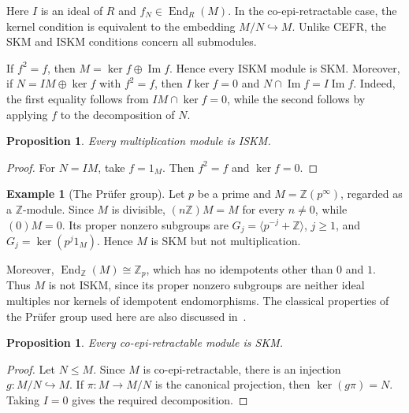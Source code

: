 \documentclass[11pt,a4paper]{article}
\newtheorem{proposition}[theorem]{Proposition}
\theoremstyle{definition}
\newtheorem{example}[theorem]{Example}
\theoremstyle{remark}
\begin{document}
Here $I$ is an ideal of $R$ and $f_N\in\operatorname{End}_R(M)$. In the co-epi-retractable case, the kernel condition is equivalent to the embedding $M/N\hookrightarrow M$. Unlike CEFR, the SKM and ISKM conditions concern all submodules.

If $f^2=f$, then $M=\ker f\oplus\operatorname{Im}f$.
Hence every ISKM module is SKM. Moreover, if
$N=IM\oplus\ker f$ with $f^2=f$, then
$I\ker f=0$ and
$N\cap\operatorname{Im}f=I\operatorname{Im}f$.
Indeed, the first equality follows from
$IM\cap\ker f=0$, while the second follows
by applying $f$ to the decomposition of $N$.

\begin{proposition}
Every multiplication module is ISKM.
\end{proposition}

\begin{proof}
For $N=IM$, take $f=1_M$. Then $f^2=f$ and $\ker f=0$.
\end{proof}

\begin{example}[The Pr\"ufer group]
Let $p$ be a prime and $M=\mathbb{Z}(p^\infty)$, regarded as a $\mathbb{Z}$-module. Since $M$ is divisible, $(n\mathbb{Z})M=M$ for every $n\ne0$, while $(0)M=0$. Its proper nonzero subgroups are $G_j=\langle p^{-j}+\mathbb{Z}\rangle$, $j\geq1$, and $G_j=\ker(p^j1_M)$. Hence $M$ is SKM but not multiplication.

Moreover, $\operatorname{End}_{\mathbb{Z}}(M)\cong\mathbb{Z}_p$, which has no idempotents other than $0$ and $1$. Thus $M$ is not ISKM, since its proper nonzero subgroups are neither ideal multiples nor kernels of idempotent endomorphisms. The classical properties of the Pr\"ufer group used here are also discussed in~\cite{AndersonCorrection}.
\end{example}

\begin{proposition}
Every co-epi-retractable module is SKM.
\end{proposition}

\begin{proof}
Let $N\leq M$. Since $M$ is co-epi-retractable, there is an injection $g:M/N\hookrightarrow M$. If $\pi:M\to M/N$ is the canonical projection, then $\ker(g\pi)=N$. Taking $I=0$ gives the required decomposition.
\end{proof}
\end{document}
